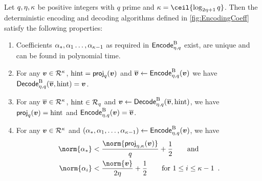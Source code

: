 \begin{lemma}\label{lem:latencode}
Let $q,\eta,\kappa$ be positive integers with $q$ prime and $\limbs = \ceil{\log_{2\eta+1}q}$.
Then the deterministic encoding and decoding algorithms defined in \autoref{fig:EncodingCoeff} satisfy the following properties:
\begin{enumerate}
 \item Coefficients $\alpha_{\ast},\alpha_1\ldots,\alpha_{\kappa-1}$ as required in $\mathsf{Encode}^{\textup{B}}_{\eta,q}$ exist, are unique and can be found in polynomial time.\label{item:basis}
 \item For any $\boldsymbol{v}\in\mathcal{R}^\kappa$, $\mathrm{hint} = \mathsf{proj}_{q}(\boldsymbol{v})$ and $\overline{\boldsymbol{v}} \gets \mathsf{Encode}^{\textup{B}}_{\eta,q}(\boldsymbol{v})$ we have
 $\mathsf{Decode}^{\textup{B}}_{\eta,q}(\overline{\boldsymbol{v}}, \mathrm{hint}) = \boldsymbol{v}$.\label{item:inverse1}
 \item For any $\overline{\boldsymbol{v}}\in\mathcal{R}^\kappa$, $\mathrm{hint}\in\mathcal{R}_q$ and $\boldsymbol{v}\gets\mathsf{Decode}^{\textup{B}}_{\eta,q}(\overline{\boldsymbol{v}}, \mathrm{hint})$, we have\\
 $\mathsf{proj}_{q}(\boldsymbol{v})  = \mathrm{hint}$ and $\mathsf{Encode}^{\textup{B}}_{\eta,q}(\boldsymbol{v}) = \overline{\boldsymbol{v}}$.\label{item:inverse2}
 \item For any $\boldsymbol{v}\in\mathcal{R}^\kappa$ and $(\alpha_{\ast},\alpha_1,\ldots,\alpha_{\kappa-1}) \gets \mathsf{Encode}^{\textup{B}}_{\eta,q}(\boldsymbol{v})$, we have
 \begin{align*}
   \norm{\alpha_\qbasis} <{}& \frac{\norm{\projring(\vec{v})}}{q} + \frac{1}{2}\qquad\text{and}\\
   \norm{\alpha_i} <{}& \frac{\norm{\vec{v}}}{2\eta} + \frac{1}{2} \qquad\text{for $1\leq i \leq \limbs-1$}\enspace.
 \end{align*}\label{item:latencodebounds}
\end{enumerate}
\end{lemma}
